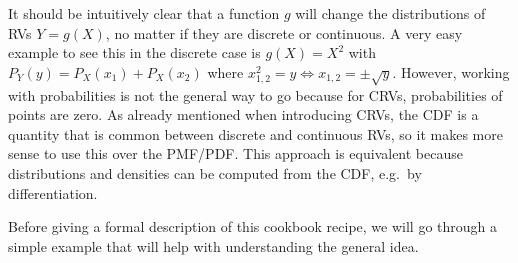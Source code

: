 It should be intuitively clear that a function $g$ will change the distributions of RVs $Y = g(X)$, no matter if they are discrete or continuous. A very easy example to see this in the discrete case is $g(X) = X^2$ with $P_Y(y) = P_X(x_1) + P_X(x_2)$ where $x_{1, 2}^2 = y \Leftrightarrow x_{1, 2} = \pm \sqrt{y}$. However, working with probabilities is not the general way to go because for CRVs, probabilities of points are zero. As already mentioned when introducing CRVs, the CDF is a quantity that is common between discrete and continuous RVs, so it makes more sense to use this over the PMF/PDF. This approach is equivalent because distributions and densities can be computed from the CDF, e.g.~by differentiation.


Before giving a formal description of this cookbook recipe, we will go through a simple example that will help with understanding the general idea.



